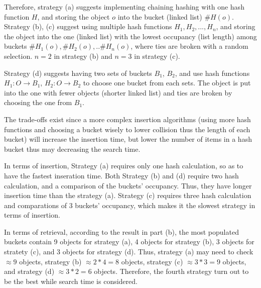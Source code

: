 \documentclass[12pt]{article}
\begin{document}
\begin{enumerate}[label=(\alph*)]
Therefore, strategy (a) suggests implementing chaining hashing with one hash function $H$, and storing the object $o$ into the bucket (linked list) $\#H(o)$. Strategy (b), (c) suggest using multiple hash functions $H_1, H_2, ..., H_n$, and storing the object into the one (linked list) with the lowest occupancy (list length) among buckets $\#H_1(o), \#H_2(o), .. \#H_n(o)$, where ties are broken with a random selection. $n=2$ in strategy (b) and $n=3$ in strategy (c).

Strategy (d) suggests having two sets of buckets $B_1$, $B_2$, and use hash functions $H_1:O\rightarrow{}B_1$, $H_2:O\rightarrow{}B_2$ to choose one bucket from each sets. The object is put into the one with fewer objects (shorter linked list) and ties are broken by choosing the one from $B_1$.

The trade-offs exist since a more complex insertion algorithms (using more hash functions and choosing a bucket wisely to lower collision thus the length of each bucket) will increase the insertion time, but lower the number of items in a hash bucket thus may decreasing the search time.

In terms of insertion, Strategy (a) requires only one hash calculation, so as to have the fastest inseration time. Both Strategy (b) and (d) require two hash calculation, and a comparison of the buckets' occupancy. Thus, they have longer insertion time than the strategy (a). Strategy (c) requires three hash calculation and comparations of 3 buckets' occupancy, which makes it the slowest strategy in terms of insertion.

In terms of retrieval, according to the result in part (b), the most populated buckets contain 9 objects for strategy (a), 4 objects for strategy (b), 3 objects for stratety (c), and 3 objects for strategy (d). Thus, strategy (a) may need to check $\approx{}9$ objects, strategy (b) $\approx{}2*4=8$ objects, strategy (c) $\approx{}3*3=9$ objects, and strategy (d) $\approx{}3*2=6$ objects. Therefore, the fourth strategy turn out to be the best while search time is considered.

\end{enumerate}
\end{document}

